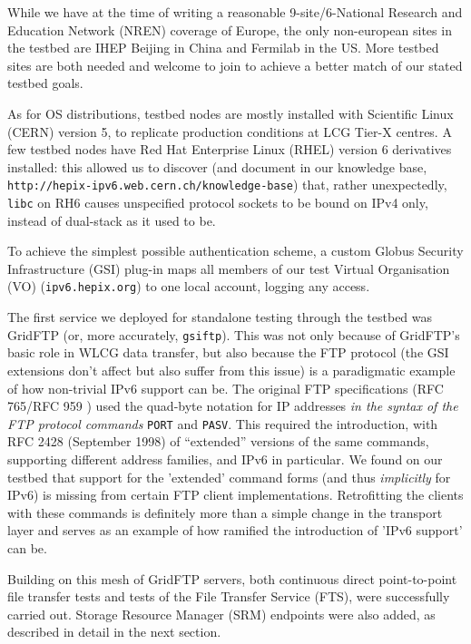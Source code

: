 While we have at the time of writing a reasonable
9-site/6-National Research and Education Network (NREN) coverage of Europe, the only non-european sites in the testbed
are IHEP Beijing in China and Fermilab in the US. More testbed sites are both needed and welcome to join 
to achieve a better match of our stated testbed goals.
\par
As for OS distributions, testbed nodes are mostly installed with 
Scientific Linux (CERN) version 5,
to replicate production conditions at LCG Tier-X centres. A few testbed nodes
have Red Hat Enterprise Linux (RHEL) \cite{rhel} version 6 derivatives installed: this allowed us to discover 
(and document in our knowledge base, {\tt http://hepix-ipv6.web.cern.ch/knowledge-base})
that, rather unexpectedly, {\tt libc} on RH6 causes unspecified 
protocol sockets to be bound on IPv4 only, instead of dual-stack 
as it used to be.
\par
To achieve the simplest possible authentication scheme, a custom Globus
Security Infrastructure (GSI)
plug-in maps all members of our test Virtual Organisation (VO) ({\tt ipv6.hepix.org}) to one
local account, logging any access. 
\par
The first service we deployed for standalone testing through the testbed was
GridFTP (or, more accurately, {\tt gsiftp}). 
This was not only because of GridFTP's basic role in WLCG data
transfer, but also because the FTP protocol (the GSI extensions don't 
affect but also suffer from this issue) is a paradigmatic example of 
how non-trivial IPv6 support can be. The original FTP specifications 
(RFC 765/RFC 959 \cite{rfc}) used the quad-byte notation for IP addresses 
{\em in the syntax of the FTP protocol commands} {\tt PORT} and {\tt PASV}.
This required the introduction, with RFC 2428 (September 1998) \cite{rfc} of
``extended'' versions of the same commands, supporting different address
families, and IPv6 in particular. We found on our testbed that support for 
the 'extended' command forms (and thus {\em implicitly} for IPv6)
is missing from certain FTP client implementations. Retrofitting the
clients with these commands is definitely more than a simple change in
the transport layer and serves as an example of how ramified the
introduction of 'IPv6 support' can be.
\par
Building on this mesh of GridFTP servers, both continuous direct point-to-point 
file transfer tests and tests of the File Transfer Service 
(FTS), were successfully carried out. Storage Resource Manager (SRM) endpoints
were also added, as described in detail in the next section.
